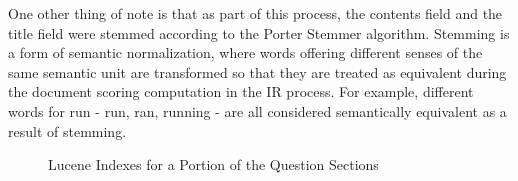 One other thing of note is that as part of this process, the contents field and the title field were stemmed according to the Porter Stemmer algorithm.  Stemming is a form of semantic normalization, where words offering different senses of the same semantic unit are transformed so that they are treated as equivalent during the document scoring computation in the IR process.  For example, different words for run - run, ran, running - are all considered semantically equivalent as a result of stemming.

\begin{figure}
\centering
\vspace{1.0in}
\caption{Lucene Indexes for a Portion of the Question Sections}
\label{fig:lucene_indexes}
\end{figure}



